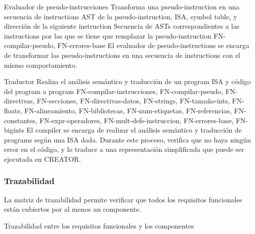 \begin{component}{Evaluador de pseudo-instrucciones}
    {Transforma una \gls{pseudo-instruction} en una secuencia de \glspl{instruction}} %
    {} %
    {\gls{AST} de la \gls{pseudo-instruction}, \gls{ISA}, \gls{symbol table}, y dirección de la siguiente \gls{instruction}} %
    {Secuencia de \glspl{AST} correspondientes a las \glspl{instruction} por las que se tiene que remplazar la \gls{pseudo-instruction}} %
    {FN-compilar-pseudo, FN-errores-base} %
    El evaluador de \glspl{pseudo-instruction} se encarga de transformar las
    \glspl{pseudo-instruction} en una secuencia de \glspl{instruction} con el
    mismo comportamiento.
\end{component}

\begin{component}{Traductor}
    {Realiza el análisis semántico y traducción de un \gls{program} } %
    {\NA} %
    {\gls{ISA} y código del \gls{program} a } %
    {\Gls{program} } %
    {FN-compilar-instrucciones, FN-compilar-pseudo, FN-directivas,
    FN-secciones, FN-directivas-datos, FN-strings, FN-tamaño-ints,
    FN-floats, FN-alineamiento, FN-bibliotecas, FN-num-etiquetas,
    FN-referencias, FN-constantes, FN-expr-operadores,
    FN-mult-defs-instruccion, FN-errores-base, FN-bigints} %
    El \gls{compiler} se encarga de realizar el análisis semántico y traducción
    de \glspl{program}  según una \gls{ISA} dada.
    Durante este proceso, verifica que no haya ningún error en el código, y lo
    traduce a una representación simplificada que puede ser ejecutada en
    CREATOR.
\end{component}

\FloatBarrier

\subsubsection{Trazabilidad}

La matriz de trazabilidad permite verificar que todos los requisitos funcionales
están cubiertos por al menos un componente.

\begin{landscape}
        {Trazabilidad entre los requisitos funcionales y los componentes}
\end{landscape}


